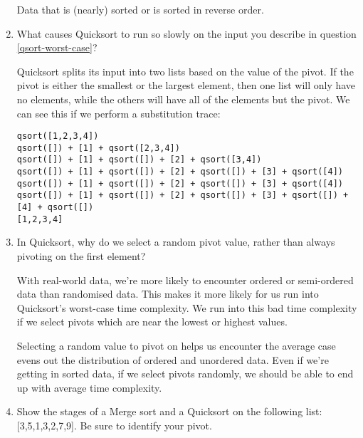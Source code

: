 \documentclass[11pt]{article}
\newenvironment{answer}{\large\lstset{basicstyle=\large}\color{white}}{}
\newenvironment{answer}{\large\lstset{basicstyle=\large}\color{red}}{}
\begin{document}
\begin{enumerate}
      \begin{answer}
      Data that is (nearly) sorted or is sorted in reverse order.
      \end{answer}

\item What causes Quicksort to run so slowly on the input you describe in
      question \ref{qsort-worst-case}?

    \begin{answer}
    Quicksort splits its input into two lists based on the value of the pivot.
    If the pivot is either the smallest or the largest element, then one list
    will only have no elements, while the others will have all of the elements
    but the pivot. We can see this if we perform a substitution trace:

\begin{verbatim}
qsort([1,2,3,4])
qsort([]) + [1] + qsort([2,3,4])
qsort([]) + [1] + qsort([]) + [2] + qsort([3,4])
qsort([]) + [1] + qsort([]) + [2] + qsort([]) + [3] + qsort([4])
qsort([]) + [1] + qsort([]) + [2] + qsort([]) + [3] + qsort([4])
qsort([]) + [1] + qsort([]) + [2] + qsort([]) + [3] + qsort([]) + [4] + qsort([])
[1,2,3,4]
\end{verbatim}
    \end{answer}

\item In Quicksort, why do we select a random pivot value, rather than always
      pivoting on the first element?

      \begin{answer}
      With real-world data, we're more likely to encounter ordered or
      semi-ordered data than randomised data. This makes it more likely for us
      run into Quicksort's worst-case time complexity. We run into this bad
      time complexity if we select pivots which are near the lowest or highest
      values.

      Selecting a random value to pivot on helps us encounter the average case
      evens out the distribution of ordered and unordered data. Even if we're
      getting in sorted data, if we select pivots randomly, we should be able
      to end up with average time complexity.
      \end{answer}

\pagebreak
\item Show the stages of a Merge sort and a Quicksort on the following list:
      [3,5,1,3,2,7,9]. Be sure to identify your pivot.


\end{enumerate}
\end{document}
